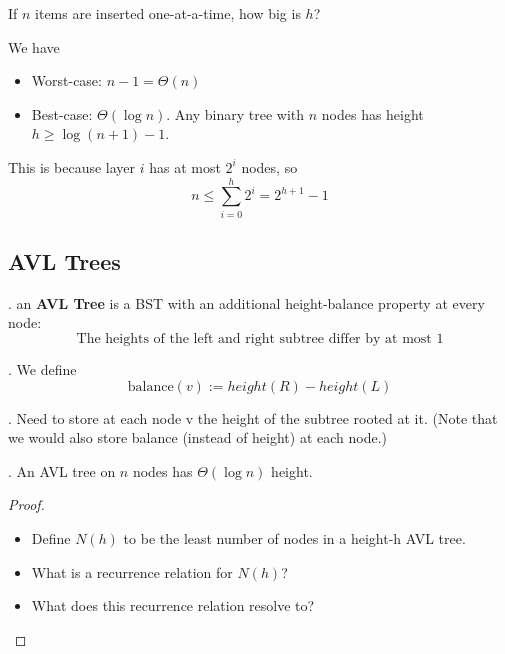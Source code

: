 \documentclass{article}
\begin{document}
\begin{Question}{}
    If $n$ items are inserted one-at-a-time, how big is $h$?
\end{Question}

\begin{solution}
    We have 
    \begin{itemize}
        \item Worst-case: $n - 1 = \Theta(n)$ 
        \item Best-case: $\Theta(\log{n})$. Any binary tree with $n$ nodes has height $h \geq \log(n + 1) -1$. 
    \end{itemize}
    This is because layer $i$ has at most $2^i$ nodes, so 
    \[ n \leq \sum_{i = 0}^h 2^i = 2^{h+1} - 1 \] 
\end{solution}

\subsection{AVL Trees} 

\begin{deff}.
    an \textbf{AVL Tree} is a BST with an additional height-balance property at every node: 
    \[ \text{The heights of the left and right subtree differ by at most 1} \]
\end{deff}

\begin{deff}.
    We define 
    \[ \mathrm{balance} (v) := height(R) - height(L) \]
\end{deff}

\begin{codes}[].
    Need to store at each node v the height of the subtree rooted at it. (Note that we would also store balance (instead of height) at each node.)
\end{codes}

\begin{thmm}[].
    An AVL tree on $n$ nodes has $\Theta (\log{n})$ height.
\end{thmm}

\begin{proof}
    \begin{itemize}
        \item Define $N(h)$ to be the least number of nodes in a height-h AVL tree. \item What is a recurrence relation for $N(h)$? 
        \item What does this recurrence relation resolve to?
    \end{itemize}
\end{proof}
\end{document}
